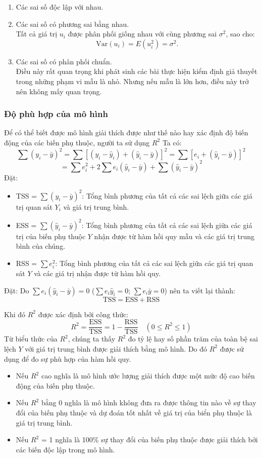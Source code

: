 \begin{enumerate}
    \item[3.] Các sai số độc lập với nhau.
    \item[4.] Các sai số có phương sai bằng nhau.\\
    Tất cả giá trị $u_i$ được phân phối giống nhau với cùng phương sai $\sigma^2$, sao cho:
    \[
    \text{Var}(u_i) = E(u_i^2) = \sigma^2.
    \]
    \item[5.] Các sai số có phân phối chuẩn.\\
    Điều này rất quan trọng khi phát sinh các bài thực hiện kiểm định giả thuyết trong những phạm vi mẫu là nhỏ. Nhưng nếu mẫu là lớn hơn, điều này trở nên không mấy quan trọng.
\end{enumerate}
\subsubsection{Độ phù hợp của mô hình}
Để có thể biết được mô hình giải thích được như thế nào hay xác định độ biến động của các biến phụ thuộc, người ta sử dụng $R^2$
Ta có: 
\[
\sum (y_i - \bar{y})^2 = \sum [(y_i - \hat{y}_i) + (\hat{y}_i - \bar{y})]^2 
= \sum [e_i + (\hat{y}_i - \bar{y})]^2
\]
\[
= \sum e_i^2 + 2\sum e_i (\hat{y}_i - \bar{y}) + \sum (\hat{y}_i - \bar{y})^2
\]
Đặt:
\begin{itemize}
    \item TSS = $\sum (y_i - \bar{y})^2$: Tổng bình phương của tất cả các sai lệch giữa các giá trị quan sát $Y_i$ và giá trị trung bình.
    \item ESS = $\sum (\hat{y}_i - \bar{y})^2$: Tổng bình phương của tất cả các sai lệch giữa các giá trị của biến phụ thuộc $Y$ nhận được từ hàm hồi quy mẫu và các giá trị trung bình của chúng.
    \item RSS = $\sum e_i^2$: Tổng bình phương của tất cả các sai lệch giữa các giá trị quan sát $Y$ và các giá trị nhận được từ hàm hồi quy.
\end{itemize}
Đặt:
Do $\sum e_i (\hat{y}_i - \bar{y}) = 0$ ($\sum e_i \hat{y}_i = 0$; $\sum e_i \bar{y} = 0$) nên ta viết lại thành:
\[
\text{TSS} = \text{ESS} + \text{RSS}
\]

Khi đó $R^2$ được xác định bởi công thức:
\[
R^2 = \frac{\text{ESS}}{\text{TSS}} = 1 - \frac{\text{RSS}}{\text{TSS}} \quad (0 \leq R^2 \leq 1)
\]
Từ biểu thức của $R^2$, chúng ta thấy $R^2$ đo tỷ lệ hay số phần trăm của toàn bệ sai lệch $Y$ với giá trị trung bình được giải thích bằng mô hình. Do đó $R^2$ được sử dụng để đo sự phù hợp của hàm hồi quy.
\begin{itemize}
    \item Nếu $R^2$ cao nghĩa là mô hình ước lượng giải thích được một mức độ cao biến động của biến phụ thuộc.
    \item Nếu $R^2$ bằng 0 nghĩa là mô hình không đưa ra được thông tin nào về sự thay đổi của biến phụ thuộc và dự đoán tốt nhất về giá trị của biển phụ thuộc là giá trị trung bình.
    \item Nếu $R^2$ = 1 nghĩa là 100\% sự thay đổi của biến phụ thuộc được giải thích bởi các biến độc lập trong mô hình.
\end{itemize}
